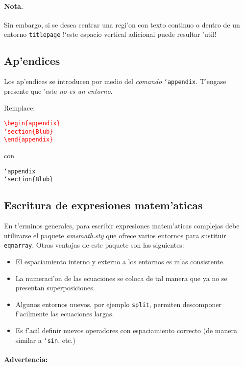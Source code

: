 \documentclass[11pt,a4paper,pagesize,tablecaptionabove,abstracton,pointlessnumbers]{scrartcl}
\newcommand{\Paket}[1]{\textsf{\textsl{#1.sty}}\xspace}
\newcommand{\Env}[2]{\raggedright\texttt{\textbackslash begin\{#1\}\\
    #2\\ \textbackslash end\{#1\}}}
\DeclareRobustCommand*{\Macro}[1]{\mbox{\texttt{\char`\\#1}}}
\DeclareRobustCommand*{\LMacro}[2]{\mbox{\texttt{\char`\\#1\{#2\}}}}
\newcommand{\Ersetze}[2]{\par\noindent Remplace: \textcolor{red}{#1}
  con \textcolor{gruen}{#2}}
\begin{document}
\paragraph{Nota.}
\label{sec:anmerkung-4}

Sin embargo, si se desea centrar una regi'on con texto continuo o dentro de un entorno
\verb+titlepage+ !`este espacio vertical adicional puede resultar 'util!

\subsection{Ap'endices}
\label{sec:der-anhang}

Los ap'endices se introducen por medio del \emph{comando} \Macro{appendix}.
T'engase presente que 'este \emph{no es un entorno}.

\sbox{\Breite}{\LMacro{begin}{appendix}}
\Ersetze{\parbox[t]{\wd\Breite}{%
    \Env{appendix}%
    {\LMacro{section}{Blub}}}}%
{\parbox[t]{.33\textwidth}{%
    \Macro{appendix}\\
    \LMacro{section}{Blub} }}

\subsection{Escritura de expresiones matem'aticas}
\label{sec:mathematiksatz}

En t'erminos generales, para escribir expresiones matem'aticas complejas debe utilizarse el paquete \Paket{amsmath} que ofrece varios entornos para sustituir \texttt{eqnarray}. Otras ventajas de este paquete son las siguientes:

\begin{itemize}
  \item El espaciamiento interno y externo a los entornos es m'as consistente.
  \item La numeraci'on de las ecuaciones se coloca de tal manera que ya no se presentan superposiciones.
  \item Algunos entornos nuevos, por ejemplo \texttt{split}, permiten descomponer f'acilmente las ecuaciones largas.
  \item Es f'acil definir nuevos operadores con espaciamiento correcto (de manera similar a \Macro{sin}, etc.)
\end{itemize}

\paragraph{Advertencia:}
\label{sec:warnung}
\end{document}
